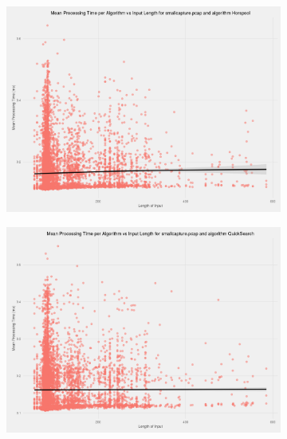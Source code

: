 \documentclass[11pt]{article}
\begin{document}
\begin{figure}
  \centering
  \begin{subfigure}[b]{0.45\textwidth}
      \includegraphics[width=\textwidth]{images/scatter_mean_vs_input_length_Horspool}
  \end{subfigure}
  \begin{subfigure}[b]{0.45\textwidth}
      \includegraphics[width=\textwidth]{images/scatter_mean_vs_input_length_QuickSearch}
  \end{subfigure}
  ~
  \begin{subfigure}[b]{0.45\textwidth}

\end{subfigure}
\end{figure}
\end{document}
